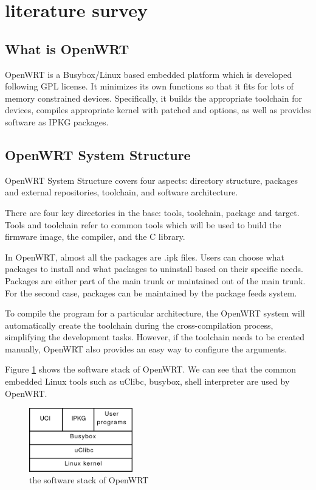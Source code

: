 \documentclass{sig-alternate-05-2015}
\begin{document}
	\section{literature survey}
	
	\subsection{What is OpenWRT}
	OpenWRT \cite{fainelli2008OpenWRT, kim2014implementation} is a Busybox/Linux based embedded platform which is developed following GPL license. It minimizes its own functions so that it fits for lots of memory constrained devices. Specifically, it builds the appropriate toolchain for devices, compiles appropriate kernel with patched and options, as well as provides software as IPKG packages.
	
	\subsection{OpenWRT System Structure}
	OpenWRT System Structure covers four aspects: directory structure, packages and external repositories, toolchain, and software architecture.
	
	There are four key directories in the base: tools, toolchain, package and target.
	Tools and toolchain refer to common tools which will be used to build the firmware image, the compiler, and the C library.
	
	In OpenWRT, almost all the packages are .ipk files. Users can choose what packages to install and what packages to uninstall based on their specific needs. Packages are either part of the main trunk or maintained out of the main trunk. For the second case, packages can be maintained by the package feeds system.
	
	To compile the program for a particular architecture, the OpenWRT system will automatically create the toolchain during the cross-compilation process, simplifying the development tasks. However, if the toolchain needs to be created manually, OpenWRT also provides an easy way to configure the arguments.
	
	Figure \ref{OpenWRT:stack} shows the software stack of OpenWRT. We can see that the common embedded Linux tools such as uClibc, busybox, shell interpreter are used by OpenWRT.
	
	\begin{figure}
		\centering
		\includegraphics[width=0.4\textwidth]{stack.png}
		\caption{the software stack of OpenWRT}
		\label{OpenWRT:stack}
	\end{figure}
	
\end{document}
